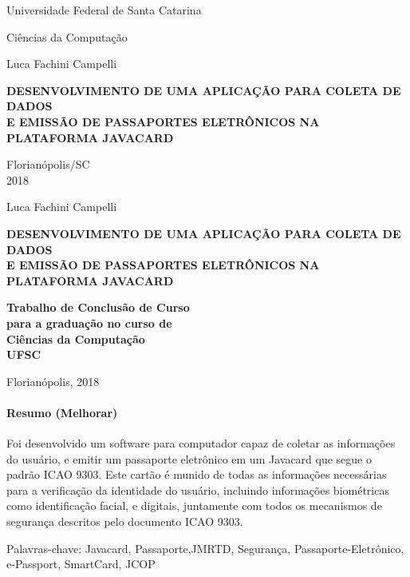\documentclass{article}
\begin{document}
	\begin{center}

		{\LARGE Universidade Federal de Santa Catarina \par}
		\vspace {2cm}
		
		Ciências da Computação
		\vspace{2cm}

		Luca Fachini Campelli
		\vspace {4cm}

		\textbf{DESENVOLVIMENTO DE UMA APLICAÇÃO PARA COLETA DE DADOS \\
				E EMISSÃO DE PASSAPORTES ELETRÔNICOS NA PLATAFORMA JAVACARD}
		\vspace {10cm}
		
		Florianópolis/SC \\

		2018
	\end{center}

	\newpage
	\begin{center}
		Luca Fachini Campelli
		\vspace{2cm}
		
		\textbf{\large DESENVOLVIMENTO DE UMA APLICAÇÃO PARA COLETA DE DADOS \\
				E EMISSÃO DE PASSAPORTES ELETRÔNICOS NA PLATAFORMA JAVACARD}
		\vspace{2cm}

		\hfill \textbf{Trabalho de Conclusão de Curso \\}
		\hfill \textbf{para a graduação no curso de\\}
		\hfill \textbf{Ciências \hspace{18pt} da \hspace{18pt} Computação \\}
		\hfill \textbf{UFSC  \hspace{60pt}}

		\vspace{1cm}

		\hfill Florianópolis, 2018

	\end{center}

	\newpage

	\paragraph{\large Resumo (Melhorar)}
		\begin{justify}
			\hspace{2cm} Foi desenvolvido um software para computador capaz de coletar as informações do usuário, e emitir um passaporte eletrônico em um Javacard que segue o padrão ICAO 9303. Este cartão é munido de todas as informações necessárias para a verificação da identidade do usuário, incluindo informações biométricas como identificação facial, e digitais, juntamente com todos os mecanismos de segurança descritos pelo documento ICAO 9303.
	
	\vspace*{10px}
Palavras-chave: Javacard, Passaporte,JMRTD, Segurança, Passaporte-Eletrônico, e-Passport, SmartCard, JCOP
		\end{justify}
\end{document}
